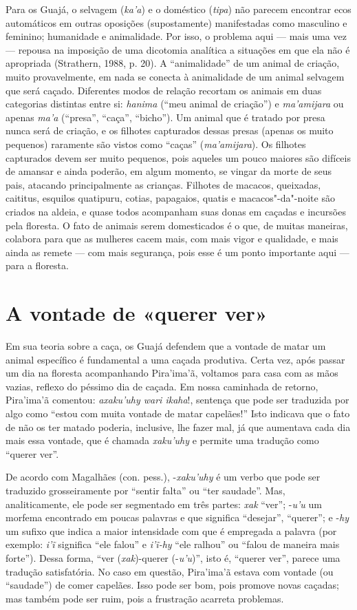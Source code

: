 Para os Guajá, o selvagem (\emph{ka'a}) e o doméstico (\emph{tipa}) não
parecem encontrar ecos automáticos em outras oposições (supostamente)
manifestadas como masculino e feminino; humanidade e animalidade. Por
isso, o problema aqui --- mais uma vez --- repousa na imposição de uma
dicotomia analítica a situações em que ela não é apropriada (Strathern,
1988, p. 20). A ``animalidade'' de um animal de criação, muito
provavelmente, em nada se conecta à animalidade de um animal selvagem
que será caçado. Diferentes modos de relação recortam os animais em duas
categorias distintas entre si: \emph{hanima} (``meu animal de criação'')
e \emph{ma'amijara} ou apenas \emph{ma'a} (``presa'', ``caça'',
``bicho''). Um animal que é tratado por presa nunca será de criação, e
os filhotes capturados dessas presas (apenas os muito pequenos)
raramente são vistos como ``caças'' (\emph{ma'amijara}). Os filhotes
capturados devem ser muito pequenos, pois aqueles um pouco maiores são
difíceis de amansar e ainda poderão, em algum momento, se vingar da
morte de seus pais, atacando principalmente as crianças. Filhotes de
macacos, queixadas, caititus, esquilos quatipuru, cotias, papagaios,
quatis e macacos"-da"-noite são criados na aldeia, e quase todos
acompanham suas donas em caçadas e incursões pela floresta. O fato de
animais serem domesticados é o que, de muitas maneiras, colabora para
que as mulheres cacem mais, com mais vigor e qualidade, e mais ainda as
remete --- com mais segurança, pois esse é um ponto importante aqui --- para
a floresta.

\section{A vontade de «querer ver»}

Em sua teoria sobre a caça, os Guajá defendem que a vontade de matar um
animal específico é fundamental a uma caçada produtiva. Certa vez, após
passar um dia na floresta acompanhando Pira'ima'ã, voltamos para casa
com as mãos vazias, reflexo do péssimo dia de caçada. Em nossa caminhada
de retorno, Pira'ima'ã comentou: \emph{axaku'uhy wari ikaha}!, sentença
que pode ser traduzida por algo como ``estou com muita vontade de matar
capelães!'' Isto indicava que o fato de não os ter matado poderia,
inclusive, lhe fazer mal, já que aumentava cada dia mais essa vontade,
que é chamada \emph{xaku'uhy} e permite uma tradução como ``querer ver''.

De acordo com Magalhães (con. pess.), -\emph{xaku'uhy} é um verbo que
pode ser traduzido grosseiramente por ``sentir falta'' ou ``ter saudade''.
Mas, analiticamente, ele pode ser segmentado em três partes: \emph{xak}
``ver''; -\emph{u'u} um morfema encontrado em poucas palavras e que
significa ``desejar'', ``querer''; e -\emph{hy} um sufixo que indica a maior
intensidade com que é empregada a palavra (por exemplo: \emph{i'ĩ}
significa ``ele falou'' e \emph{i'ĩ-hy} ``ele ralhou'' ou ``falou de maneira
mais forte''). Dessa forma, ``ver (\emph{xak})-querer (-\emph{u'u})'', isto
é, ``querer ver'', parece uma tradução satisfatória. No caso em questão,
Pira'ima'ã estava com vontade (ou ``saudade'') de comer capelães. Isso
pode ser bom, pois promove novas caçadas; mas também pode ser ruim, pois
a frustração acarreta problemas.

